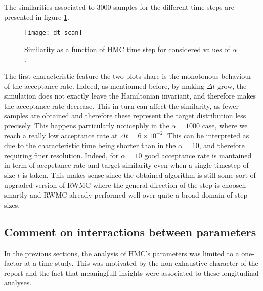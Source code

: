 \documentclass[a4paper, 12pt,oneside]{article}
\begin{document}
			The similarities associated to 3000 samples for the different time steps are presented in figure \ref{fig:dt-scan}.
			\begin{figure}[htb]
				\centering
					\vspace{0em}
					\texttt{[image: dt\_scan]}
					\caption{Similarity as a function of HMC time step for considered values of $\alpha$.}
					\label{fig:dt-scan}
			\end{figure}
			The first characteristic feature the two plots share is the monotonous behaviour of the acceptance rate. Indeed, as mentionned before, by making $\Delta t$ grow, the simulation does not exactly leave the Hamiltonian invariant, and therefore makes the acceptance rate decrease. This in turn can affect the similarity, as fewer samples are obtained and therefore these represent the target distribution less precisely. This happens particularly noticepbly in the $\alpha=1000$ case, where we reach a really low acceptance rate at $\Delta t=6\times 10^{-2}$. This can be interpreted as due to the characteristic time being shorter than in the $\alpha=10$, and therefore requiring finer resolution. Indeed, for $\alpha=10$ good acceptance rate is mantained in term of accpetance rate and target similarity even when a single timestep of size $t$ is taken. This makes sense since the obtained algorithm is still some sort of upgraded version of RWMC where the general direction of the step is choosen smartly and RWMC already performed well over quite a broad domain of step sizes.   
			\subsection{Comment on interractions between parameters}
			In the previous sections, the analysis of HMC's parameters was limited to a one-factor-at-a-time study. This was motivated by the non-exhaustive character of the report and the fact that meaningfull insights were associated to these longitudinal analyses. 
			
\end{document}
